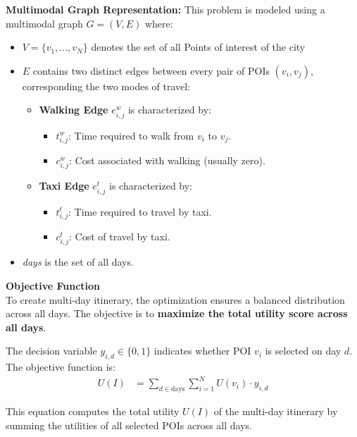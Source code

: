 {\noindent \textbf{Multimodal Graph Representation:}
This problem is modeled using a multimodal graph \( G = (V, E) \) where:

\begin{itemize}
    \item \( V = \{v_1, ..., v_N\} \) denotes the set of all Points of interest of the city
    \item \( E \) contains two distinct edges between every pair of POIs \( (v_i, v_j) \), corresponding the two modes of travel:
    \begin{itemize}
        \item \textbf{Walking Edge} \( e^{w}_{i,j} \) is characterized by:
        \begin{itemize}
            \item \( t^{w}_{i,j} \): Time required to walk from \( v_i \) to \( v_j \).
            \item \( c^{w}_{i,j} \): Cost associated with walking (usually zero).
        \end{itemize}
        \item \textbf{Taxi Edge} \( e^{t}_{i,j} \) is characterized by:
        \begin{itemize}
            \item \( t^{t}_{i,j} \): Time required to travel by taxi.
            \item \( c^{t}_{i,j} \): Cost of travel by taxi.
        \end{itemize}
    \end{itemize}
    \item \textit{days} is the set of all days.
\end{itemize}

\noindent \textbf{Objective Function}\\
To create multi-day itinerary, the optimization ensures a balanced distribution across all days. The objective is to \textbf{maximize the total utility score across all days}.

The decision variable \( y_{i,d} \in \{0,1\} \) indicates whether POI \( v_i \) is selected on day \( d \). The objective function is:
\begin{align}
U(I) &= \sum_{d \in \text{days}} \sum_{i = 1}^{N} U(v_i) \cdot y_{i,d} \label{eq:multi_day_binary}
\end{align}

This equation computes the total utility $U(I)$ of the multi-day itinerary by summing the utilities of all selected POIs across all days.

}
